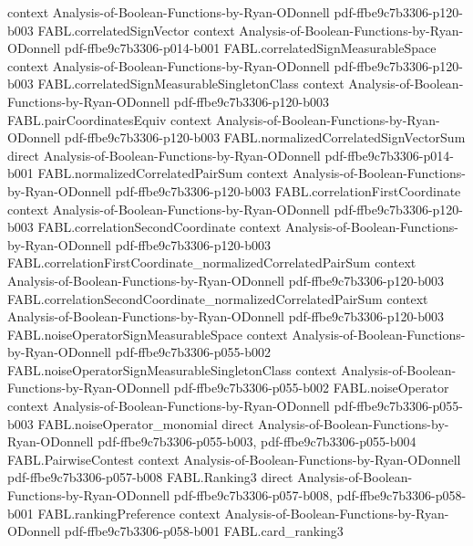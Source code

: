 \begin{theorem}
  {context}
  {Analysis-of-Boolean-Functions-by-Ryan-ODonnell}
  {pdf-ffbe9c7b3306-p120-b003}
\proofstep
  {FABL.correlatedSignVector}
  {context}
  {Analysis-of-Boolean-Functions-by-Ryan-ODonnell}
  {pdf-ffbe9c7b3306-p014-b001}
\proofstep
  {FABL.correlatedSignMeasurableSpace}
  {context}
  {Analysis-of-Boolean-Functions-by-Ryan-ODonnell}
  {pdf-ffbe9c7b3306-p120-b003}
\proofstep
  {FABL.correlatedSignMeasurableSingletonClass}
  {context}
  {Analysis-of-Boolean-Functions-by-Ryan-ODonnell}
  {pdf-ffbe9c7b3306-p120-b003}
\proofstep
  {FABL.pairCoordinatesEquiv}
  {context}
  {Analysis-of-Boolean-Functions-by-Ryan-ODonnell}
  {pdf-ffbe9c7b3306-p120-b003}
\proofstep
  {FABL.normalizedCorrelatedSignVectorSum}
  {direct}
  {Analysis-of-Boolean-Functions-by-Ryan-ODonnell}
  {pdf-ffbe9c7b3306-p014-b001}
\proofstep
  {FABL.normalizedCorrelatedPairSum}
  {context}
  {Analysis-of-Boolean-Functions-by-Ryan-ODonnell}
  {pdf-ffbe9c7b3306-p120-b003}
\proofstep
  {FABL.correlationFirstCoordinate}
  {context}
  {Analysis-of-Boolean-Functions-by-Ryan-ODonnell}
  {pdf-ffbe9c7b3306-p120-b003}
\proofstep
  {FABL.correlationSecondCoordinate}
  {context}
  {Analysis-of-Boolean-Functions-by-Ryan-ODonnell}
  {pdf-ffbe9c7b3306-p120-b003}
\proofstep
  {FABL.correlationFirstCoordinate_normalizedCorrelatedPairSum}
  {context}
  {Analysis-of-Boolean-Functions-by-Ryan-ODonnell}
  {pdf-ffbe9c7b3306-p120-b003}
\proofstep
  {FABL.correlationSecondCoordinate_normalizedCorrelatedPairSum}
  {context}
  {Analysis-of-Boolean-Functions-by-Ryan-ODonnell}
  {pdf-ffbe9c7b3306-p120-b003}
\proofstep
  {FABL.noiseOperatorSignMeasurableSpace}
  {context}
  {Analysis-of-Boolean-Functions-by-Ryan-ODonnell}
  {pdf-ffbe9c7b3306-p055-b002}
\proofstep
  {FABL.noiseOperatorSignMeasurableSingletonClass}
  {context}
  {Analysis-of-Boolean-Functions-by-Ryan-ODonnell}
  {pdf-ffbe9c7b3306-p055-b002}
\proofstep
  {FABL.noiseOperator}
  {context}
  {Analysis-of-Boolean-Functions-by-Ryan-ODonnell}
  {pdf-ffbe9c7b3306-p055-b003}
\proofstep
  {FABL.noiseOperator_monomial}
  {direct}
  {Analysis-of-Boolean-Functions-by-Ryan-ODonnell}
  {pdf-ffbe9c7b3306-p055-b003,
    pdf-ffbe9c7b3306-p055-b004}
\proofstep
  {FABL.PairwiseContest}
  {context}
  {Analysis-of-Boolean-Functions-by-Ryan-ODonnell}
  {pdf-ffbe9c7b3306-p057-b008}
\proofstep
  {FABL.Ranking3}
  {direct}
  {Analysis-of-Boolean-Functions-by-Ryan-ODonnell}
  {pdf-ffbe9c7b3306-p057-b008,
    pdf-ffbe9c7b3306-p058-b001}
\proofstep
  {FABL.rankingPreference}
  {context}
  {Analysis-of-Boolean-Functions-by-Ryan-ODonnell}
  {pdf-ffbe9c7b3306-p058-b001}
\proofstep
  {FABL.card_ranking3}

\end{theorem}
